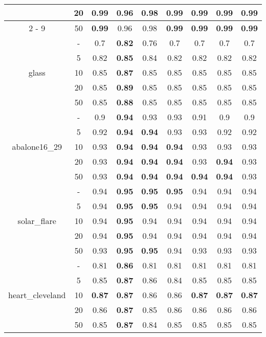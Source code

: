 \documentclass{article}%
\begin{document}
\begin{tabular}{c|c|ccccccc}
&20&\textbf{0.99}&0.96&0.98&\textbf{0.99}&\textbf{0.99}&\textbf{0.99}&\textbf{0.99}\\%
\cline{2%
-%
9}%
&50&\textbf{0.99}&0.96&0.98&\textbf{0.99}&\textbf{0.99}&\textbf{0.99}&\textbf{0.99}\\%
\hline%
\multirow{5}{*}{glass}&{-}&0.7&\textbf{0.82}&0.76&0.7&0.7&0.7&0.7\\%
\cline{2%
-%
9}%
&5&0.82&\textbf{0.85}&0.84&0.82&0.82&0.82&0.82\\%
\cline{2%
-%
9}%
&10&0.85&\textbf{0.87}&0.85&0.85&0.85&0.85&0.85\\%
\cline{2%
-%
9}%
&20&0.85&\textbf{0.89}&0.85&0.85&0.85&0.85&0.85\\%
\cline{2%
-%
9}%
&50&0.85&\textbf{0.88}&0.85&0.85&0.85&0.85&0.85\\%
\hline%
\multirow{5}{*}{abalone16\_29}&{-}&0.9&\textbf{0.94}&0.93&0.93&0.91&0.9&0.9\\%
\cline{2%
-%
9}%
&5&0.92&\textbf{0.94}&\textbf{0.94}&0.93&0.93&0.92&0.92\\%
\cline{2%
-%
9}%
&10&0.93&\textbf{0.94}&\textbf{0.94}&\textbf{0.94}&0.93&0.93&0.93\\%
\cline{2%
-%
9}%
&20&0.93&\textbf{0.94}&\textbf{0.94}&\textbf{0.94}&0.93&\textbf{0.94}&0.93\\%
\cline{2%
-%
9}%
&50&0.93&\textbf{0.94}&\textbf{0.94}&\textbf{0.94}&\textbf{0.94}&\textbf{0.94}&0.93\\%
\hline%
\multirow{5}{*}{solar\_flare}&{-}&0.94&\textbf{0.95}&\textbf{0.95}&\textbf{0.95}&0.94&0.94&0.94\\%
\cline{2%
-%
9}%
&5&0.94&\textbf{0.95}&\textbf{0.95}&0.94&0.94&0.94&0.94\\%
\cline{2%
-%
9}%
&10&0.94&\textbf{0.95}&0.94&0.94&0.94&0.94&0.94\\%
\cline{2%
-%
9}%
&20&0.94&\textbf{0.95}&0.94&0.94&0.94&0.94&0.94\\%
\cline{2%
-%
9}%
&50&0.93&\textbf{0.95}&\textbf{0.95}&0.94&0.93&0.93&0.93\\%
\hline%
\multirow{5}{*}{heart\_cleveland}&{-}&0.81&\textbf{0.86}&0.81&0.81&0.81&0.81&0.81\\%
\cline{2%
-%
9}%
&5&0.85&\textbf{0.87}&0.86&0.84&0.85&0.85&0.85\\%
\cline{2%
-%
9}%
&10&\textbf{0.87}&\textbf{0.87}&0.86&0.86&\textbf{0.87}&\textbf{0.87}&\textbf{0.87}\\%
\cline{2%
-%
9}%
&20&0.86&\textbf{0.87}&0.85&0.86&0.86&0.86&0.86\\%
\cline{2%
-%
9}%
&50&0.85&\textbf{0.87}&0.84&0.85&0.85&0.85&0.85\\%

\end{tabular}
\end{document}
